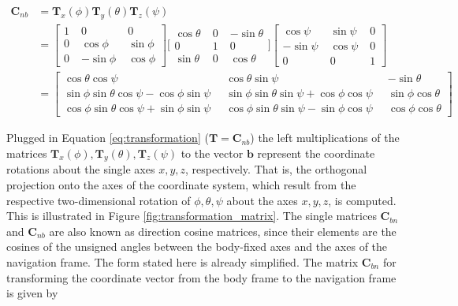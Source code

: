 \begin{equation}
\begin{split}
\mathbf{C}_{nb} & = \mathbf{T}_x(\phi) \mathbf{T}_y(\theta) \mathbf{T}_z(\psi) \\
 & = {\left[ \begin{smallmatrix}
    1 \; & 0 \; & 0 \\
    0 \; & \cos \phi \; & \sin \phi \\
    0 \; & -\sin \phi \; & \cos \phi
    \end{smallmatrix}\right]}
    {\bigg[ \begin{smallmatrix}
    \cos \theta \; & 0 \; & -\sin \theta \\
    0 \; & 1 \; & 0 \\
    \sin \theta \; & 0 \; & \cos \theta
    \end{smallmatrix} \bigg]}
    {\left[\begin{smallmatrix}
    \cos \psi \; & \sin \psi \; & 0 \\
    -\sin \psi \; & \cos \psi \; & 0 \\
    0 \; & 0 \; & 1
    \end{smallmatrix}\right]}\\
 & = {\left[\begin{smallmatrix}
   \cos \theta \cos \psi \; &
    \cos \theta \sin \psi \; &
   -\sin \theta \\
    \sin \phi \sin \theta \cos \psi - \cos \phi \sin \psi \;\; &
    \sin \phi \sin \theta \sin \psi + \cos \phi \cos \psi \;\; &
    \sin \phi \cos \theta \\
    \cos \phi \sin \theta \cos \psi + \sin \phi \sin \psi \;\; &
    \cos \phi \sin \theta \sin \psi - \sin \phi \cos \psi \;\; &
    \cos \phi \cos \theta
  \end{smallmatrix}\right]}
\end{split}
\end{equation}

\noindent
Plugged in Equation \ref{eq:transformation} ($\mathbf{T} = \mathbf{C}_{nb}$) the left multiplications of the matrices $\mathbf{T}_x(\phi), \mathbf{T}_y(\theta), \mathbf{T}_z(\psi)$ to the vector $\mathbf{b}$ represent the coordinate rotations about the single axes $x, y, z$, respectively. That is, the orthogonal projection onto the axes of the coordinate system, which result from the respective two-dimensional rotation of $\phi, \theta, \psi$ about the axes $x, y, z$, is computed. This is illustrated in Figure \ref{fig:transformation_matrix}. The single matrices $\mathbf{C}_{bn}$ and $\mathbf{C}_{nb}$ are also known as direction cosine matrices, since their elements are the cosines of the unsigned angles between the body-fixed axes and the axes of the navigation frame. The form stated here is already simplified. The matrix $\mathbf{C}_{bn}$ for transforming the coordinate vector from the body frame to the navigation frame is given by


